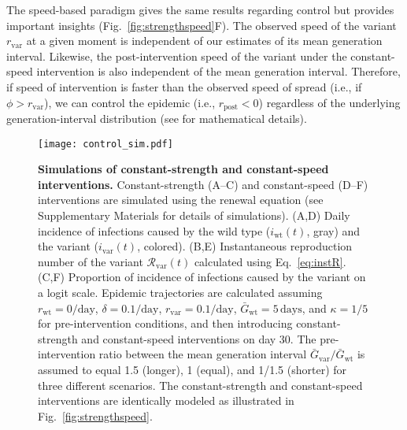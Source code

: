 \documentclass[12pt]{article}
\newcommand{\eref}[1]{Eq.~\ref{eq:#1}}
\newcommand{\fref}[1]{Fig.~\ref{fig:#1}}
\newcommand{\vvvar}{\mathrm{var}}
\newcommand{\wwwt}{\mathrm{wt}}
\newcommand{\rx}[1]{\ensuremath{{r}_{#1}}\xspace}
\newcommand{\ry}[1]{\rx{\mathrm{#1}}}
\newcommand{\rw}{\rx{\wwwt}}
\newcommand{\rv}{\rx{\vvvar}}
\newcommand{\Rx}[1]{\ensuremath{{\mathcal R}_{#1}}\xspace}
\newcommand{\Rv}{\Rx{\vvvar}}
\newcommand{\pday}{\ensuremath{/\textrm{day}}}
\newcommand{\ix}[1]{\ensuremath{{i}_{#1}}\xspace}
\newcommand{\iw}{\ix{\wwwt}}
\newcommand{\iv}{\ix{\vvvar}}
\newcommand{\Gx}[1]{\ensuremath{{\bar G}_{#1}}\xspace}
\newcommand{\Gy}[1]{\Gx{\mathrm{#1}}}
\begin{document}
The speed-based paradigm gives the same results regarding control but provides important insights (\fref{strengthspeed}F).
The observed speed of the variant $\rv$ at a given moment is independent of our estimates of its mean generation interval.
Likewise, the post-intervention speed of the variant under the constant-speed intervention is also independent of the mean generation interval.
Therefore, if speed of intervention is faster than the observed speed of spread (i.e., if $\phi > \rv$), we can control the epidemic (i.e., $\ry{post} < 0$) regardless of the underlying generation-interval distribution (see \cite{doi:10.1098/rspb.2020.1556} for mathematical details).

\begin{figure}[!th]
\begin{center}
\texttt{[image: control\_sim.pdf]}
\caption{
\textbf{Simulations of constant-strength and constant-speed interventions.}
Constant-strength (A--C) and constant-speed (D--F) interventions are simulated using the renewal equation (see Supplementary Materials for details of simulations).
(A,D) Daily incidence of infections caused by the wild type ($\iw(t)$, gray) and the variant ($\iv(t)$, colored).
(B,E) Instantaneous reproduction number of the variant $\Rv(t)$ calculated using \eref{instR}.
(C,F) Proportion of incidence of infections caused by the variant on a logit scale. 
Epidemic trajectories are calculated assuming $\rw=0\pday$, $\delta=0.1\pday$, $\rv=0.1\pday$, $\Gy{wt}=5\,\textrm{days}$, and $\kappa=1/5$ for pre-intervention conditions, and then introducing constant-strength and constant-speed interventions on day 30.
The pre-intervention ratio between the mean generation interval $\Gy{var}/\Gy{wt}$ is assumed to equal 1.5 (longer), 1 (equal), and 1/1.5 (shorter) for three different scenarios.
The constant-strength and constant-speed interventions are identically modeled as illustrated in \fref{strengthspeed}.
}
\label{fig:control_sim}
\end{center}
\end{figure}
\end{document}
